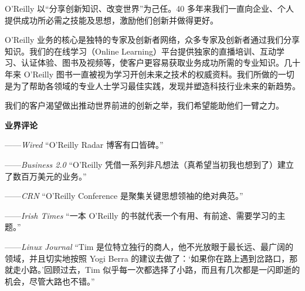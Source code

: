 
O'Reilly 以“分享创新知识、改变世界”为己任。40 多年来我们一直向企业、个人提供成功所必需之技能及思想，激励他们创新并做得更好。

O'Reilly 业务的核心是独特的专家及创新者网络，众多专家及创新者通过我们分享知识。我们的在线学习（Online Learning）平台提供独家的直播培训、互动学习、认证体验、图书及视频等，使客户更容易获取业务成功所需的专业知识。几十年来 O'Reilly 图书一直被视为学习开创未来之技术的权威资料。我们所做的一切是为了帮助各领域的专业人士学习最佳实践，发现并塑造科技行业未来的新趋势。

我们的客户渴望做出推动世界前进的创新之举，我们希望能助他们一臂之力。

\textbf{业界评论}

\begin{myEpigraph}{——\emph{Wired}}
“O'Reilly Radar 博客有口皆碑。”
\end{myEpigraph}

\begin{myEpigraph}{——\emph{Business 2.0}}
“O'Reilly 凭借一系列非凡想法（真希望当初我也想到了）建立了数百万美元的业务。”
\end{myEpigraph}

\begin{myEpigraph}{——\emph{CRN}}
“O'Reilly Conference 是聚集关键思想领袖的绝对典范。”
\end{myEpigraph}

\begin{myEpigraph}{——\emph{Irish Times}}
“一本 O'Reilly 的书就代表一个有用、有前途、需要学习的主题。”
\end{myEpigraph}

\begin{myEpigraph}{——\emph{Linux Journal}}
“Tim 是位特立独行的商人，他不光放眼于最长远、最广阔的领域，并且切实地按照 Yogi Berra 的建议去做了：‘如果你在路上遇到岔路口，那就走小路。’回顾过去，Tim 似乎每一次都选择了小路，而且有几次都是一闪即逝的机会，尽管大路也不错。”
\end{myEpigraph}


